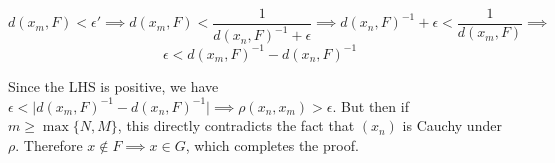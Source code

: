 \begin{solution}
    \[d(x_m, F) < \epsilon' \implies d(x_m, F) < \frac{1}{d(x_n, F)^{-1} + \epsilon} \implies d(x_n, F)^{-1} + \epsilon < \frac{1}{d(x_m, F)} \implies \]
    \[\epsilon < d(x_m, F)^{-1} - d(x_n, F)^{-1}\]

    Since the LHS is positive, we have $\epsilon < \lvert d(x_m, F)^{-1} - d(x_n, F)^{-1} \rvert \implies \rho(x_n, x_m) > \epsilon$.
    But then if $m \geq \max\{N, M\}$, this directly contradicts the fact that $(x_n)$ is Cauchy under $\rho$.
    Therefore $x \notin F \implies x \in G$, which completes the proof.

\end{solution}